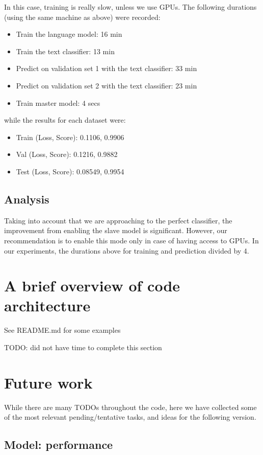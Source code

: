 \documentclass[11pt, oneside]{article}   	%
\begin{document}
In this case, training is really slow, unless we use GPUs. The following durations (using the same machine as above) were recorded:
\begin{itemize}
\item Train the language model: 16 min
\item Train the text classifier: 13 min
\item Predict on validation set 1 with the text classifier: 33 min
\item Predict on validation set 2 with the text classifier: 23 min
\item Train master model: 4 secs
\end{itemize}
while the results for each dataset were:
\begin{itemize}
\item Train (Loss, Score): 0.1106, 0.9906
\item Val (Loss, Score): 0.1216, 0.9882
\item Test (Loss, Score): 0.08549, 0.9954
\end{itemize}

\subsection{Analysis}

Taking into account that we are approaching to the perfect classifier, the improvement from enabling the slave model is significant. However, our recommendation is to enable this mode only in case of having access to GPUs. In our experiments,  the durations above for training and prediction divided by 4.

\section{A brief overview of code architecture}

See \textsf{README.md} for some examples

TODO: did not have time to complete this section


\section{Future work}

While there are many TODOs throughout the code, here we have collected some of the most relevant pending/tentative tasks, and ideas for the following version.

\subsection{Model: performance}
\end{document}
